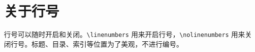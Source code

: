 \documentclass{simplivre}
\providecommand{\meta}[1]{$\langle${\normalfont\itshape#1}$\rangle$}
\providecommand{\simplivre}{\textsf{simplivre}}
\begin{document}








\section{关于行号}
行号可以随时开启和关闭。\lstinline|\linenumbers| 用来开启行号，\lstinline|\nolinenumbers| 用来关闭行号。标题、目录、索引等位置为了美观，不进行编号。
\end{document}
